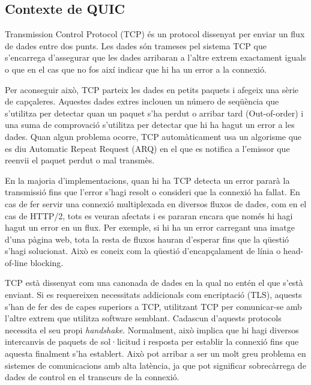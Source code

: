 \subsection{Contexte de QUIC}
{
    Transmission Control Protocol (TCP) és un protocol dissenyat per enviar un flux de dades entre dos punts. Les dades són trameses
    pel sistema TCP que s'encarrega d'assegurar que les dades arribaran a l'altre extrem exactament iguals o que en el cas que no
    fos així indicar que hi ha un error a la connexió.
    
    Per aconseguir això, TCP parteix les dades en petits paquets i afegeix una sèrie de capçaleres. Aquestes dades extres inclouen un
    número de seqüència que s'utilitza per detectar quan un paquet s'ha perdut o arribar tard (Out-of-order) i una suma de comprovació
    s'utilitza per detectar que hi ha hagut un error a les dades. Quan algun problema ocorre, TCP automàticament usa un algorisme
    que es diu Automatic Repeat Request (ARQ) en el que es notifica a l'emissor que reenvii el paquet perdut o mal transmès.
    
    En la majoria d'implementacions, quan hi ha TCP detecta un error pararà la transmissió fins que l'error s'hagi resolt o consideri
    que la connexió ha fallat. En cas de fer servir una connexió multiplexada en diversos fluxos de dades, com en el cas de HTTP/2, tots
    es veuran afectats i es pararan encara que només hi hagi hagut un error en un flux. Per exemple, si hi ha un error carregant una
    imatge d'una pàgina web, tota la resta de fluxos hauran d'esperar fins que la qüestió s'hagi solucionat. Això es coneix com la 
    qüestió d'encapçalament de línia o head-of-line blocking.
    
    TCP està dissenyat com una canonada de dades en la qual no entén el que s'està enviant. Si es requereixen necessitats addicionals
    com encriptació (TLS), aquests s'han de fer des de capes superiors a TCP, utilitzant TCP per comunicar-se amb l'altre extrem
    que utilitza software semblant. Cadascun d'aquests protocols necessita el seu propi \textit{handshake}. Normalment, això implica
    que hi hagi diversos intercanvis de paquets de sol·licitud i resposta per establir la connexió fins que aquesta finalment s'ha
    establert. Això pot arribar a ser un molt greu problema en sistemes de comunicacions amb alta latència, ja que pot significar
    sobrecàrrega de dades de control en el transcurs de la connexió.
}

